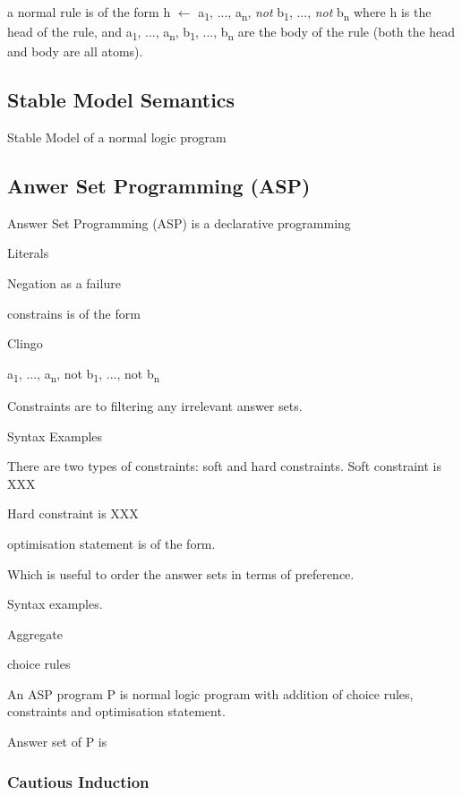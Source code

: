 \documentclass[12pt,twoside]{report}
\begin{document}
a normal rule is of the form h $\leftarrow$ a\textsubscript{1}, ..., a\textsubscript{n}, \textit{not} b\textsubscript{1}, ..., \textit{not}  b\textsubscript{n} where h is the head of the rule,
 and a\textsubscript{1}, ..., a\textsubscript{n}, b\textsubscript{1}, ..., b\textsubscript{n} are the body of the rule (both the head and body are all atoms).

\subsection{Stable Model Semantics}

Stable Model of a normal logic program

\subsection{Anwer Set Programming (ASP)}

Answer Set Programming (ASP) is a declarative programming


Literals

Negation as a failure

constrains is of the form

Clingo

\begin{theorem}
\leftarrow a\textsubscript{1}, ..., a\textsubscript{n}, not b\textsubscript{1}, ..., not b\textsubscript{n}
\end{theorem}

Constraints are to filtering any irrelevant answer sets.

Syntax Examples

There are two types of constraints: soft and hard constraints. Soft constraint is XXX

Hard constraint is XXX

optimisation statement is of the form.

Which is useful to order the answer sets in terms of preference.

Syntax examples.

Aggregate

choice rules

An ASP program P is normal logic program with addition of choice rules, constraints and optimisation statement.

Answer set of P is


\subsubsection{Cautious Induction}
\end{document}
